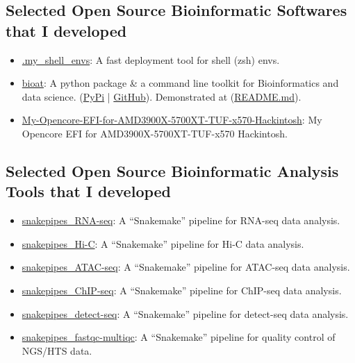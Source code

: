 \subsection*{\textbf{Selected Open Source Bioinformatic Softwares that I developed}}
\begin{itemize}
    \item \href{https://github.com/hermanzhaozzzz/.my_shell_envs}{.my\_shell\_envs}: A fast deployment tool for shell (zsh) envs.
    \item \href{https://github.com/hermanzhaozzzz/bioat}{bioat}: A python package \& a command line toolkit for Bioinformatics and data science. (\href{https://pypi.org/project/bioat/}{PyPi} | \href{https://github.com/hermanzhaozzzz/bioat}{GitHub}). Demonstrated at (\href{https://github.com/hermanzhaozzzz/bioat}{README.md}).
    \item \href{https://github.com/hermanzhaozzzz/My-Opencore-EFI-for-AMD3900X-5700XT-TUF-x570-Hackintosh}{My-Opencore-EFI-for-AMD3900X-5700XT-TUF-x570-Hackintosh}: My Opencore EFI for AMD3900X-5700XT-TUF-x570 Hackintosh.
\end{itemize}

\subsection*{\textbf{Selected Open Source Bioinformatic Analysis Tools that I developed}}
\begin{itemize}
    \item \href{https://github.com/hermanzhaozzzz/snakepipes_RNA-seq}{snakepipes\_RNA-seq}: A ``Snakemake'' pipeline for RNA-seq data analysis.
    \item \href{https://github.com/hermanzhaozzzz/snakepipes_Hi-C}{snakepipes\_Hi-C}: A ``Snakemake'' pipeline for Hi-C data analysis.
    \item \href{https://github.com/hermanzhaozzzz/snakepipes_ATAC-seq}{snakepipes\_ATAC-seq}: A ``Snakemake'' pipeline for ATAC-seq data analysis.
    \item \href{https://github.com/hermanzhaozzzz/snakepipes_ChIP-seq}{snakepipes\_ChIP-seq}: A ``Snakemake'' pipeline for ChIP-seq data analysis.
    \item \href{https://github.com/hermanzhaozzzz/snakepipes_detect-seq}{snakepipes\_detect-seq}: A ``Snakemake'' pipeline for detect-seq data analysis.
    \item \href{https://github.com/hermanzhaozzzz/snakepipes_fastqc-multiqc}{snakepipes\_fastqc-multiqc}: A ``Snakemake'' pipeline for quality control of NGS/HTS data.
\end{itemize}

